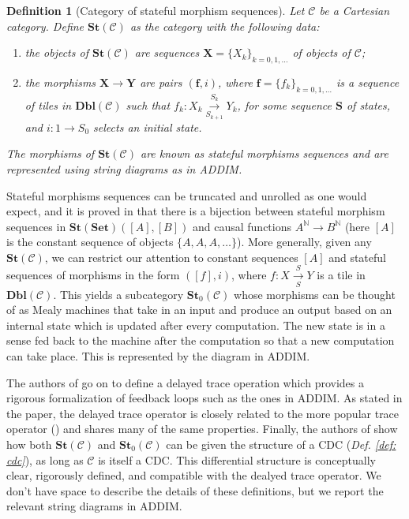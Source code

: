 \documentclass[11pt,a4paper,openright,twoside]{report}
\theoremstyle{plain}
\newtheorem{definition}[proposition]{Definition}
\theoremstyle{definition}
\begin{document}
\begin{definition}[Category of stateful morphism sequences]
  Let $\mathcal{C}$ be a Cartesian category. Define $\mathbf{St}(\mathcal{C})$ as the category with the following data:
  \begin{enumerate}
    \item the objects of $\mathbf{St}(\mathcal{C})$ are sequences $\mathbf{X} = \{X_k\}_{k = 0,1,\dots}$ of objects of $\mathcal{C}$;
    \item the morphisms $\mathbf{X} \to \mathbf{Y}$ are pairs $(\mathbf{f}, i)$, where $\mathbf{f} = \{f_k\}_{k = 0,1,\dots}$ is a sequence of tiles in $\mathbf{Dbl}(\mathcal{C})$ such that $f_k: X_k \overset{S_k}{\underset{S_{k+1}}\longrightarrow} Y_k$, for some sequence $\mathbf{S}$ of states, and $i: 1 \to S_0$ selects an initial state. 
  \end{enumerate}
  The morphisms of $\mathbf{St}(\mathcal{C})$ are known as stateful morphisms sequences and are represented using string diagrams as in ADDIM.
\end{definition}

Stateful morphisms sequences can be truncated and unrolled as one would expect, and it is proved in \cite{sprunger2019differentiable} that there is a bijection between stateful morphism sequences in $\mathbf{St}(\mathbf{Set})([A],[B])$ and causal functions $A^{\mathbb{N}} \to B^{\mathbb{N}}$ (here $[A]$ is the constant sequence of objects $\{A,A,A,\dots\}$). More generally, given any $\mathbf{St}(\mathcal{C})$, we can restrict our attention to constant sequences $[A]$ and stateful sequences of morphisms in the form $([f],i)$, where $f:X \overset{S}{\underset{S}\longrightarrow} Y$ is a tile in $\mathbf{Dbl}(\mathcal{C})$. This yields a subcategory $\mathbf{St}_0(\mathcal{C})$ whose morphisms can be thought of as Mealy machines that take in an input and produce an output based on an internal state which is updated after every computation. The new state is in a sense fed back to the machine after the computation so that a new computation can take place. This is represented by the diagram in ADDIM.

The authors of \cite{sprunger2019differentiable} go on to define a delayed trace operation which provides a rigorous formalization of feedback loops such as the ones in ADDIM. As stated in the paper, the delayed trace operator is closely related to the more popular trace operator (\cite{joyal1996traced}) and shares many of the same properties. 
Finally, the authors of \cite{sprunger2019differentiable} show how both $\mathbf{St}(\mathcal{C})$ and $\mathbf{St}_0(\mathcal{C})$ can be given the structure of a CDC (\textit{Def. \ref{def: cdc}}), as long as $\mathcal{C}$ is itself a CDC. This differential structure is conceptually clear, rigorously defined, and compatible with the dealyed trace operator. We don't have space to describe the details of these definitions, but we report the relevant string diagrams in ADDIM.
\end{document}
